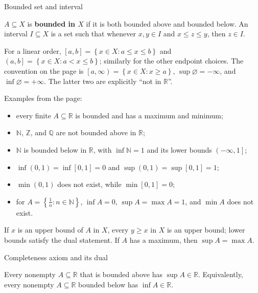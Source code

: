 \begin{definition}{Bounded set and interval}

\(A \subseteq X\) is \textbf{bounded in \(X\)} if it is both bounded above and bounded below. An interval \(I \subseteq X\) is a set such that whenever \(x,y \in I\) and \(x \leq z \leq y\), then \(z \in I\).

\end{definition}

For a linear order, \(\left\lbrack {a,b} \right\rbrack = \left\{ {x \in X:a \leq x \leq b} \right\}\) and \(\left( {a,b} \right\rbrack = \left\{ {x \in X:a < x \leq b} \right\}\); similarly for the other endpoint choices. The convention on the page is \(\left\lbrack {a,\infty} \right) = \left\{ {x \in X:x \geq a} \right\}\), \(\sup\varnothing = - \infty\), and \(\inf\varnothing = + \infty\). The latter two are explicitly ``not in \(\mathbb{R}\)''.

Examples from the page:

\begin{itemize}
\tightlist
\item
  every finite \(A \subseteq \mathbb{R}\) is bounded and has a maximum and minimum;
\item
  \(\mathbb{N}\), \(\mathbb{Z}\), and \(\mathbb{Q}\) are not bounded above in \(\mathbb{R}\);
\item
  \(\mathbb{N}\) is bounded below in \(\mathbb{R}\), with \(\inf\mathbb{N} = 1\) and its lower bounds \(\left( {- \infty,1} \right\rbrack\);
\item
  \(\inf\left( {0,1} \right) = \inf\left\lbrack {0,1} \right\rbrack = 0\) and \(\sup\left( {0,1} \right) = \sup\left\lbrack {0,1} \right\rbrack = 1\);
\item
  \(\min\left( {0,1} \right)\) does not exist, while \(\min\left\lbrack {0,1} \right\rbrack = 0\);
\item
  for \(A = \left\{ {\frac{1}{n}:n \in \mathbb{N}} \right\}\), \(\inf A = 0\), \(\sup A = \max A = 1\), and \(\min A\) does not exist.
\end{itemize}

If \(x\) is an upper bound of \(A\) in \(X\), every \(y \geq x\) in \(X\) is an upper bound; lower bounds satisfy the dual statement. If \(A\) has a maximum, then \(\sup A = \max A\).

\begin{theorem}{Completeness axiom and its dual}

Every nonempty \(A \subseteq \mathbb{R}\) that is bounded above has \(\sup A \in \mathbb{R}\). Equivalently, every nonempty \(A \subseteq \mathbb{R}\) bounded below has \(\inf A \in \mathbb{R}\).

\end{theorem}


